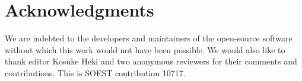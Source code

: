 
\section{Acknowledgments}

We are indebted to the developers and maintainers of the open-source software without
which this work would not have been possible.
We would also like to thank editor Kosuke Heki and two anonymous reviewers for their
comments and contributions.
This is SOEST contribution 10717.

